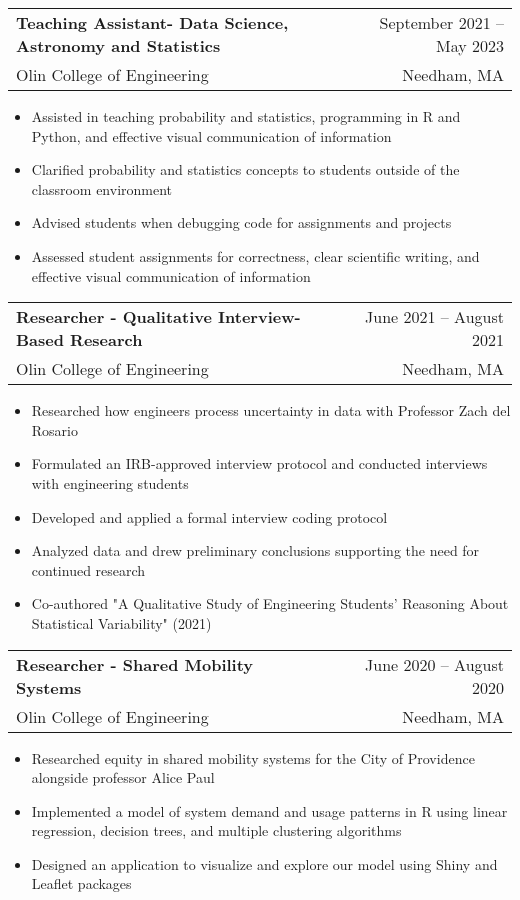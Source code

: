 \documentclass[letterpaper,10pt]{article}
\makeatletter
\newcommand{\resumeItem}[1]{
  \item\small{
    {#1\vspace{-2pt}}
  }
}
\newcommand{\resumeSubheading}[4]{
  \vspace{-2pt}\item
    \begin{tabular*}{0.97\textwidth}[t]{l@{\extracolsep{\fill}}r}
      \textbf{#1} & #2 \\
      \small#3 & \small #4 \\
    \end{tabular*}\vspace{-7pt}
}
\newcommand{\resumeItemListStart}{\begin{itemize}}
\newcommand{\resumeItemListEnd}{\end{itemize}\vspace{-5pt}}
\makeatother
\begin{document}
    \resumeSubheading
      {Teaching Assistant- Data Science, Astronomy and Statistics}{September 2021 -- May 2023}
      {Olin College of Engineering}{Needham, MA}
      \resumeItemListStart
        \resumeItem{Assisted in teaching probability and statistics, programming in R and Python, and effective visual communication of information}
        \resumeItem{Clarified probability and statistics concepts to students outside of the classroom environment}
        \resumeItem{Advised students when debugging code for assignments and projects}
        \resumeItem{Assessed student assignments for correctness, clear scientific writing, and effective visual communication of information}
    \resumeItemListEnd

    \resumeSubheading
      {Researcher - Qualitative Interview-Based Research}{June 2021 -- August 2021}
      {Olin College of Engineering}{Needham, MA}
      \resumeItemListStart
        \resumeItem{Researched how engineers process uncertainty in data with Professor Zach del Rosario}
        \resumeItem{Formulated an IRB-approved interview protocol and conducted interviews with engineering students}
        \resumeItem{Developed and applied a formal interview coding protocol}
        \resumeItem{Analyzed data and drew preliminary conclusions supporting the need for continued research}
        \resumeItem{Co-authored "A Qualitative Study of Engineering Students’ Reasoning About Statistical Variability" (2021)}
    \resumeItemListEnd

    \resumeSubheading
      {Researcher - Shared Mobility Systems}{June 2020 -- August 2020}
      {Olin College of Engineering}{Needham, MA}
      \resumeItemListStart
        \resumeItem{Researched equity in shared mobility systems for the City of Providence alongside professor Alice Paul}
        \resumeItem{Implemented a model of system demand and usage patterns in R using linear regression, decision trees, and multiple clustering algorithms}
        \resumeItem{Designed an application to visualize and explore our model using Shiny and Leaflet packages}
    \resumeItemListEnd
\end{document}
